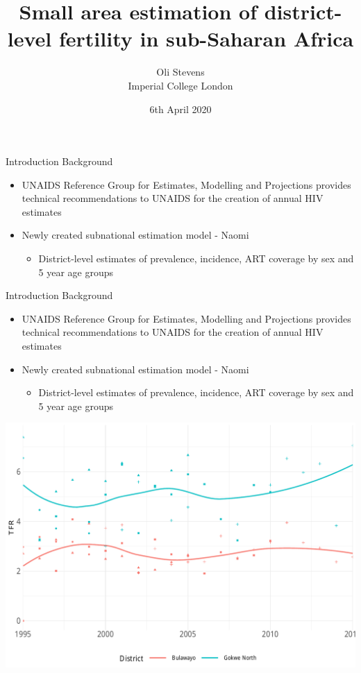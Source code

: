\documentclass[ignorenonframetext,]{beamer}
\title{Small area estimation of district-level fertility in sub-Saharan Africa}
\author{Oli Stevens\\
Imperial College London}
\date{6th April 2020}
\providecommand{\tightlist}{%
  \setlength{\itemsep}{0pt}\setlength{\parskip}{0pt}}
\begin{document}
\frame{\titlepage}

\begin{frame}[t]{Introduction \textbar{} Background}
\protect\hypertarget{introduction-background}{}

\begin{itemize}
\tightlist
\item
  UNAIDS Reference Group for Estimates, Modelling and Projections
  provides technical recommendations to UNAIDS for the creation of
  annual HIV estimates
\item
  Newly created subnational estimation model - Naomi

  \begin{itemize}
  \tightlist
  \item
    District-level estimates of prevalence, incidence, ART coverage by
    sex and 5 year age groups
  \end{itemize}
\end{itemize}

\end{frame}

\begin{frame}[t]{Introduction \textbar{} Background}
\protect\hypertarget{introduction-background-1}{}

\begin{itemize}
\tightlist
\item
  UNAIDS Reference Group for Estimates, Modelling and Projections
  provides technical recommendations to UNAIDS for the creation of
  annual HIV estimates
\item
  Newly created subnational estimation model - Naomi

  \begin{itemize}
  \tightlist
  \item
    District-level estimates of prevalence, incidence, ART coverage by
    sex and 5 year age groups
  \end{itemize}
\end{itemize}

\begin{center}\includegraphics[height=0.5\textheight]{2020_04_UNPD_files/figure-beamer/unnamed-chunk-1-1} \end{center}

\end{frame}
\end{document}
